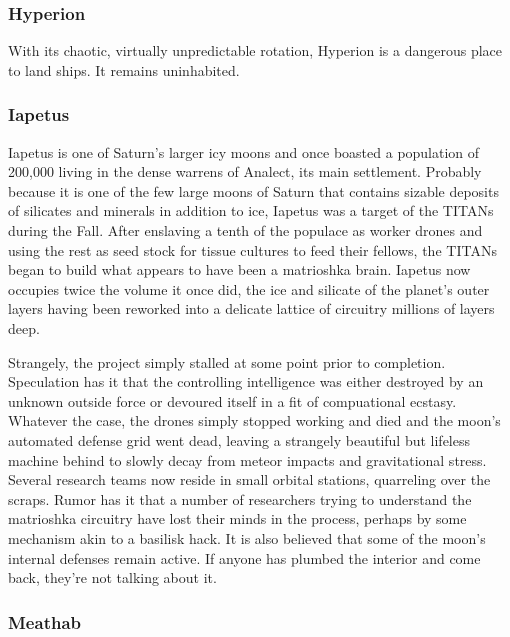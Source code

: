 \subsubsection{Hyperion}
\label{sec:hyperion}

With its chaotic, virtually unpredictable rotation, Hyperion is a
dangerous place to land ships. It remains uninhabited.

\subsubsection{Iapetus}
\label{sec:iapetus}

Iapetus is one of Saturn's larger icy moons and once boasted a
population of 200,000 living in the dense warrens of Analect, its main
settlement. Probably because it is one of the few large moons of
Saturn that contains sizable deposits of silicates and minerals in
addition to ice, Iapetus was a target of the TITANs during the
Fall. After enslaving a tenth of the populace as worker drones and
using the rest as seed stock for tissue cultures to feed their
fellows, the TITANs began to build what appears to have been a
matrioshka brain. Iapetus now occupies twice the volume it once did,
the ice and silicate of the planet's outer layers having been reworked
into a delicate lattice of circuitry millions of layers deep.

Strangely, the project simply stalled at some point prior to
completion. Speculation has it that the controlling intelligence was
either destroyed by an unknown outside force or devoured itself in a
fit of compuational ecstasy. Whatever the case, the drones simply
stopped working and died and the moon's automated defense grid went
dead, leaving a strangely beautiful but lifeless machine behind to
slowly decay from meteor impacts and gravitational stress. Several
research teams now reside in small orbital stations, quarreling over
the scraps. Rumor has it that a number of researchers trying to
understand the matrioshka circuitry have lost their minds in the
process, perhaps by some mechanism akin to a basilisk hack.  It is
also believed that some of the moon's internal defenses remain
active. If anyone has plumbed the interior and come back, they're not
talking about it.

\subsubsection{Meathab}
\label{sec:meathab}

